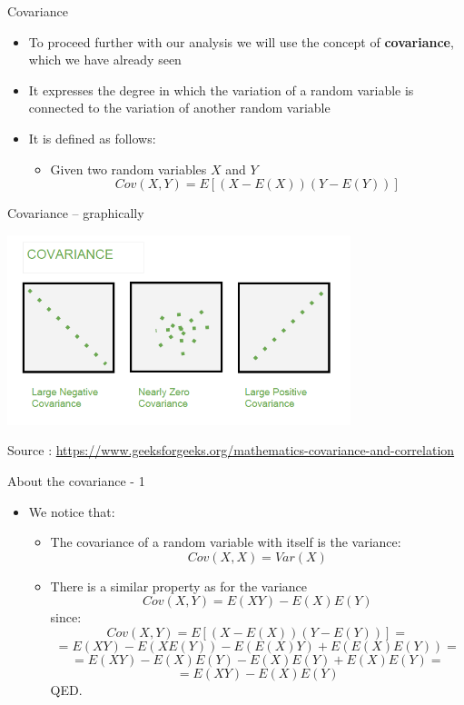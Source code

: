 \documentclass{beamer}
\begin{document}
\begin{frame}
{\centerline{Covariance}}

\begin{itemize}
\item To proceed further with our analysis we will use the concept of \textbf{covariance}, which we have already seen
\item It expresses the degree in which the variation of a random variable is connected to the variation of another random variable
\item It is defined as follows:
\begin{itemize}
\item Given two random variables $X$ and $Y$
$$Cov(X,Y) = E[ (X - E(X))(Y - E(Y))]$$
\end{itemize}
\end{itemize}

\end{frame}


\begin{frame}
{\centerline{Covariance -- graphically}}


\begin{center}
\includegraphics[width=10cm]{P2023.AIBCCSS.FoundationsDataScience/Covar.png}
\end{center} 
\begin{center}
\tiny 
Source : \url{https://www.geeksforgeeks.org/mathematics-covariance-and-correlation}
\end{center}

\end{frame}


\begin{frame}
{\centerline{About the covariance - 1}}

\begin{itemize}
\item We notice that:
\begin{itemize}
\item The covariance of a random variable with itself is the variance:
$$Cov(X,X) = Var(X)$$
\item There is a similar property as for the variance
$$Cov(X,Y) = E(XY) - E(X)E(Y)$$
since:
$$Cov(X,Y) = E[ (X - E(X))(Y - E(Y))] = $$
$$ = E(XY) - E(XE(Y)) - E(E(X)Y) + E(E(X)E(Y)) =$$
$$ = E(XY) - E(X)E(Y) - E(X)E(Y) + E(X)E(Y) = $$
$$ = E(XY) - E(X)E(Y)$$
QED.


\end{itemize}


\end{itemize}

\end{frame}
\end{document}
